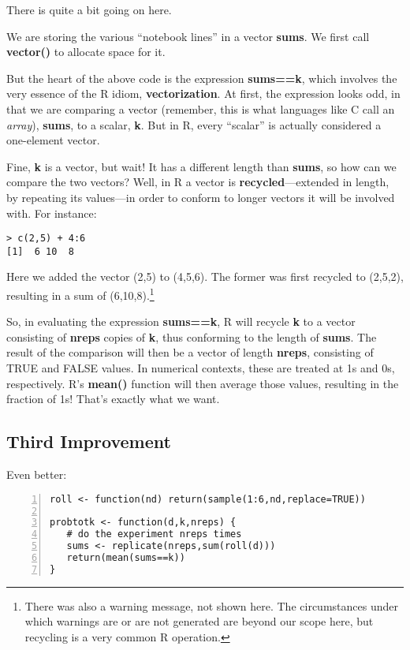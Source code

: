 There is quite a bit going on here.

We are storing the various ``notebook lines'' in a vector {\bf sums}.
We first call {\bf vector()} to allocate space for it.

But the heart of the above code is the expression {\bf sums==k}, which
involves the very essence of the R idiom, {\bf vectorization}.  At
first, the expression looks odd, in that we are comparing a vector
(remember, this is what languages like C call an {\it array}), {\bf
sums}, to a scalar, {\bf k}.  But in R, every ``scalar'' is actually
considered a one-element vector.  

Fine, {\bf k} is a vector, but wait!  It has a different length than
{\bf sums}, so how can we compare the two vectors?  Well, in R 
a vector is {\bf recycled}---extended in length, by repeating its
values---in order to conform to longer vectors it will be involved with.
For instance:

\begin{Verbatim}[fontsize=\relsize{-2}]
> c(2,5) + 4:6
[1]  6 10  8
\end{Verbatim}

Here we added the vector (2,5) to (4,5,6).  The former was first
recycled to (2,5,2), resulting in a sum of (6,10,8).\footnote{There was
also a warning message, not shown here.  The circumstances under which
warnings are or are not generated are beyond our scope here, but 
recycling is a very common R operation.}

So, in evaluating the expression {\bf sums==k}, R will recycle {\bf k}
to a vector consisting of {\bf nreps} copies of {\bf k}, thus conforming
to the length of {\bf sums}.  The result of the comparison will then be
a vector of length {\bf nreps}, consisting of TRUE and FALSE values.
In numerical contexts, these are treated at 1s and 0s, respectively.
R's {\bf mean()} function will then average those values, resulting in
the fraction of 1s!  That's exactly what we want.

\subsection{Third Improvement}
\label{thirdbetter}

Even better:

\begin{Verbatim}[fontsize=\relsize{-2},numbers=left]
roll <- function(nd) return(sample(1:6,nd,replace=TRUE))

probtotk <- function(d,k,nreps) {
   # do the experiment nreps times
   sums <- replicate(nreps,sum(roll(d)))
   return(mean(sums==k))
}
\end{Verbatim}

